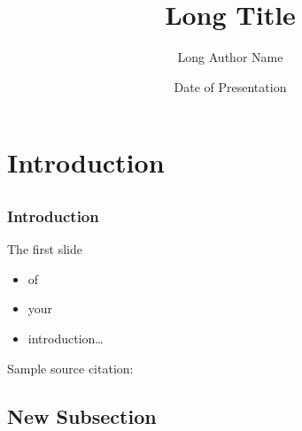 \documentclass[compress]{beamer}
\title[Short Title]{Long Title}
\author[Short Author Names]{Long Author Name}
\date{Date of Presentation}
\institute{\vspace{0.2em}
  \texttt{[image: macewan]}\\[0.25em]
  Edmonton, Alberta, Canada
}
\begin{document}


\section{Introduction}
\subsection*{}

\begin{frame}[t]
  \frametitle{Introduction}

  The first slide
  \begin{itemize}
  \item of
  \item your
  \item introduction\dots
  \end{itemize}

  \vfill

  \begin{tiny}
    \begin{minipage}{1.0\linewidth}
      Sample source citation: 
    \end{minipage}
  \end{tiny}
  
\end{frame}

\subsection{New Subsection}
\end{document}
